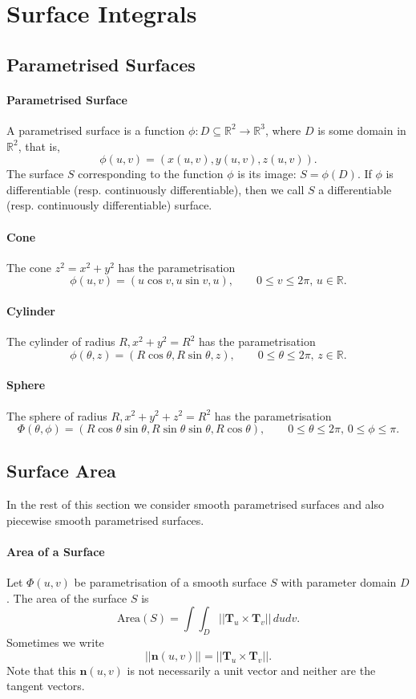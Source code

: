 \section{Surface Integrals}
\subsection{Parametrised Surfaces}
\paragraph{Parametrised Surface}
A parametrised surface is a function \(\phi: D \subseteq \mathbb R^2 \to \mathbb R^3\), where \(D\) is some domain in \(\mathbb R^2\), that is,
\[\phi (u,v) = (x(u,v), y(u,v), z(u,v)).\]
The surface \(S\) corresponding to the function \(\phi\) is its image: \(S = \phi(D)\). If \(\phi\) is differentiable (resp. continuously differentiable), then we call \(S\) a differentiable (resp. continuously differentiable) surface.

\paragraph{Cone}
The cone \(z^2 = x^2 + y^2\) has the parametrisation 
\[\phi(u,v) = (u\cos v, u\sin v, u), \qquad 0 \leq v \leq 2\pi, \, u \in \mathbb R.\]

\paragraph{Cylinder}
The cylinder of radius \(R, x^2 + y^2 = R^2\) has the parametrisation
\[\phi(\theta, z) = (R\cos\theta, R\sin\theta, z), \qquad 0\leq\theta\leq 2\pi, \, z\in\mathbb R.\]

\paragraph{Sphere}
The sphere of radius \(R, x^2 + y^2 + z^2 = R^2\) has the parametrisation
\[\Phi(\theta,\phi) = (R\cos\theta\sin\theta, R\sin\theta\sin\theta, R\cos\theta), \qquad 0 \leq \theta \leq 2\pi, \, 0 \leq \phi \leq \pi.\]

\subsection{Surface Area}
In the rest of this section we consider smooth parametrised surfaces and also piecewise smooth parametrised surfaces.

\paragraph{Area of a Surface}
Let \(\Phi(u,v)\) be parametrisation of a smooth surface \(S\) with parameter domain \(D\). The area of the surface \(S\) is
\[\text{Area}(S) = \int\int_D ||\textbf{T}_u \times \textbf{T}_v|| \, dudv.\]
Sometimes we write
\[||\textbf{n}(u,v)|| = ||\textbf{T}_u \times \textbf{T}_v||.\]
Note that this \(\textbf{n}(u,v)\) is not necessarily a unit vector and neither are the tangent vectors.